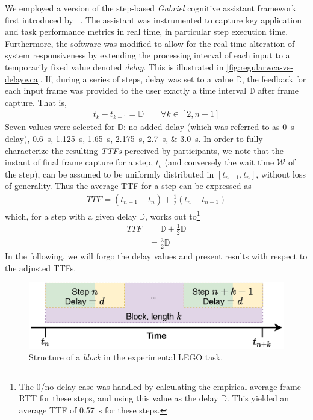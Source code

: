 We employed a version of the step-based \emph{Gabriel} cognitive assistant framework first introduced by \citeauthor{chen2018application}~\cite{chen2018application}.
The assistant was instrumented to capture key application and task performance metrics in real time, in particular step execution time.
Furthermore, the software was modified to allow for the real-time alteration of system responsiveness by extending the processing interval of each input to a temporarily fixed value denoted \emph{delay}.
This is illustrated in \cref{fig:regularwca-vs-delaywca}.
If, during a series of steps, delay was set to a value \ensuremath{\mathbb{D}}, the feedback for each input frame was provided to the user exactly a time interval \ensuremath{\mathbb{D}} after frame capture.
That is,
\begin{align}
    t_k - t_{k - 1} = \mathbb{D} \qquad \forall k \in [2, n + 1]
\end{align}
Seven values were selected for \ensuremath{\mathbb{D}}: no added delay (which was referred to as \SI{0}{\second} delay), \SIlist{0.6;1.125;1.65;2.175;2.7;3.0}{\second}.
In order to fully characterize the resulting \emph{\glspl{TTF}} perceived by participants, we note that the instant of final frame capture for a step, \ensuremath{t_c} (and conversely the wait time \( \mathcal{W} \) of the step), can be assumed to be uniformly distributed in \( [t_{n - 1}, t_n] \), without loss of generality.
Thus the average \gls{TTF} for a step can be expressed as
\begin{align*}
    TTF = (t_{n + 1} - t_{n}) + \frac{1}{2}(t_n - t_{n - 1})
\end{align*}
which, for a step with a given delay \ensuremath{\mathbb{D}}, works out to\footnote{%
    The \num{0}/no-delay case was handled by calculating the empirical average frame \gls{RTT} for these steps, and using this value as the delay \ensuremath{\mathbb{D}}.
    This yielded an average \gls{TTF} of \SI{0.57}{\second} for these steps.
}
\begin{align}
    TTF &= \mathbb{D} + \frac{1}{2}\mathbb{D}\nonumber\\
    &= \frac{3}{2}\mathbb{D}
\end{align}
In the following, we will forgo the delay values and present results with respect to the adjusted \glspl{TTF}.

\begin{figure}[tb]
    \centering
    \includegraphics[width=.6\textwidth]{publications/2021ImpactDelayedResponse/Fig4c}
    \caption{Structure of a \emph{block} in the experimental LEGO task.}\label{fig:stepblock}
\end{figure}

